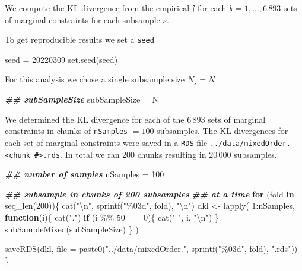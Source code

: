 \documentclass[
]{article}
\newenvironment{Shaded}{\begin{snugshade}}{\end{snugshade}}
\newcommand{\AttributeTok}[1]{\textcolor[rgb]{0.77,0.63,0.00}{#1}}
\newcommand{\ControlFlowTok}[1]{\textcolor[rgb]{0.13,0.29,0.53}{\textbf{#1}}}
\newcommand{\DecValTok}[1]{\textcolor[rgb]{0.00,0.00,0.81}{#1}}
\newcommand{\DocumentationTok}[1]{\textcolor[rgb]{0.56,0.35,0.01}{\textbf{\textit{#1}}}}
\newcommand{\FunctionTok}[1]{\textcolor[rgb]{0.00,0.00,0.00}{#1}}
\newcommand{\NormalTok}[1]{#1}
\newcommand{\OtherTok}[1]{\textcolor[rgb]{0.56,0.35,0.01}{#1}}
\newcommand{\SpecialCharTok}[1]{\textcolor[rgb]{0.00,0.00,0.00}{#1}}
\newcommand{\StringTok}[1]{\textcolor[rgb]{0.31,0.60,0.02}{#1}}
\newcommand{\prob}[1]{\mathfrak{#1}}
\begin{document}
We compute the \textsc{KL} divergence from the empirical \(\prob f\) for
each \(k = 1, \ldots, 6\,893\) sets of marginal constraints for each
subsample \(s\).

To get reproducible results we set a \texttt{seed}

\begin{Shaded}
\begin{Highlighting}[]
\NormalTok{seed }\OtherTok{=} \DecValTok{20220309}
\FunctionTok{set.seed}\NormalTok{(seed)}
\end{Highlighting}
\end{Shaded}

For this analysis we chose a single subsample size \(N_s = N\)

\begin{Shaded}
\begin{Highlighting}[]
\DocumentationTok{\#\# subSampleSize}
\NormalTok{subSampleSize }\OtherTok{=}\NormalTok{ N}
\end{Highlighting}
\end{Shaded}

We determined the \textsc{KL} divergence for each of the \(6\,893\) sets
of marginal constraints in chunks of \texttt{nSamples} \(=100\)
subsamples. The \textsc{KL} divergences for each set of marginal
constraints were saved in a \texttt{RDS} file
\texttt{../data/mixedOrder.\textless{}chunk\ \#\textgreater{}.rds}. In
total we ran 200 chunks resulting in \(20\,000\) subsamples.

\begin{Shaded}
\begin{Highlighting}[]
\DocumentationTok{\#\# number of samples}
\NormalTok{nSamples }\OtherTok{=} \DecValTok{100}

\DocumentationTok{\#\# subsample in chunks of 200 subsamples}
\DocumentationTok{\#\# at a time}
\ControlFlowTok{for}\NormalTok{ (fold }\ControlFlowTok{in} \FunctionTok{seq\_len}\NormalTok{(}\DecValTok{200}\NormalTok{))\{}
  \FunctionTok{cat}\NormalTok{(}\StringTok{"}\SpecialCharTok{\textbackslash{}n}\StringTok{"}\NormalTok{, }\FunctionTok{sprintf}\NormalTok{(}\StringTok{"\%03d"}\NormalTok{, fold), }\StringTok{"}\SpecialCharTok{\textbackslash{}n}\StringTok{"}\NormalTok{)}
\NormalTok{  dkl }\OtherTok{\textless{}{-}} \FunctionTok{lapply}\NormalTok{(}
    \DecValTok{1}\SpecialCharTok{:}\NormalTok{nSamples,}
    \ControlFlowTok{function}\NormalTok{(i)\{}
      \FunctionTok{cat}\NormalTok{(}\StringTok{"."}\NormalTok{)}
      \ControlFlowTok{if}\NormalTok{ (i }\SpecialCharTok{\%\%} \DecValTok{50} \SpecialCharTok{==} \DecValTok{0}\NormalTok{)\{}
        \FunctionTok{cat}\NormalTok{(}\StringTok{" "}\NormalTok{, i, }\StringTok{"}\SpecialCharTok{\textbackslash{}n}\StringTok{"}\NormalTok{)}
\NormalTok{      \}}
      \FunctionTok{subSampleMixed}\NormalTok{(subSampleSize)}
\NormalTok{    \}}
\NormalTok{  )}
  
  \FunctionTok{saveRDS}\NormalTok{(dkl, }\AttributeTok{file =} \FunctionTok{paste0}\NormalTok{(}\StringTok{"../data/mixedOrder."}\NormalTok{, }\FunctionTok{sprintf}\NormalTok{(}\StringTok{"\%03d"}\NormalTok{, fold), }\StringTok{".rds"}\NormalTok{))}
\NormalTok{\}}
\end{Highlighting}
\end{Shaded}
\end{document}
